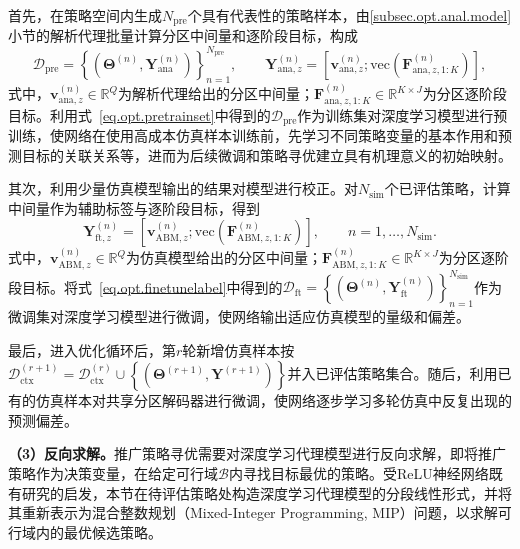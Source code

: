 首先，在策略空间内生成$N_{\mathrm{pre}}$个具有代表性的策略样本，由\ref{subsec.opt.anal.model}小节的解析代理批量计算分区中间量和逐阶段目标，构成
\begin{equation}
\mathcal{D}_{\mathrm{pre}}
=\left\{
\left(
\bm{\Theta}^{(n)},
\bm{Y}_{\mathrm{ana}}^{(n)}
\right)
\right\}_{n=1}^{N_{\mathrm{pre}}},
\qquad
\bm{Y}_{\mathrm{ana},z}^{(n)}
=\left[
\bm{v}_{\mathrm{ana},z}^{(n)};
\mathrm{vec}\left(
\bm{F}_{\mathrm{ana},z,1:K}^{(n)}
\right)
\right],
\label{eq.opt.pretrainset}
\end{equation}
式中，$\bm{v}_{\mathrm{ana},z}^{(n)}\in\mathbb{R}^{Q}$为解析代理给出的分区中间量；$\bm{F}_{\mathrm{ana},z,1:K}^{(n)}\in\mathbb{R}^{K\times J}$为分区逐阶段目标。利用式~\eqref{eq.opt.pretrainset}中得到的$\mathcal{D}_{\mathrm{pre}}$作为训练集对深度学习模型进行预训练，使网络在使用高成本仿真样本训练前，先学习不同策略变量的基本作用和预测目标的关联关系等，进而为后续微调和策略寻优建立具有机理意义的初始映射。

其次，利用少量仿真模型输出的结果对模型进行校正。对$N_{\mathrm{sim}}$个已评估策略，计算中间量作为辅助标签与逐阶段目标，得到
\begin{equation}
\bm{Y}_{\mathrm{ft},z}^{(n)}
=\left[
\bm{v}_{\mathrm{ABM},z}^{(n)};
\mathrm{vec}\left(
\bm{F}_{\mathrm{ABM},z,1:K}^{(n)}
\right)
\right],
\qquad n=1,\ldots,N_{\mathrm{sim}}.
\label{eq.opt.finetunelabel}
\end{equation}
式中，$\bm{v}_{\mathrm{ABM},z}^{(n)}\in\mathbb{R}^{Q}$为仿真模型给出的分区中间量；$\bm{F}_{\mathrm{ABM},z,1:K}^{(n)}\in\mathbb{R}^{K\times J}$为分区逐阶段目标。将式~\eqref{eq.opt.finetunelabel}中得到的$\mathcal{D}_{\mathrm{ft}}=\left\{\left(\bm{\Theta}^{(n)},\bm{Y}_{\mathrm{ft}}^{(n)}\right)\right\}_{n=1}^{N_{\mathrm{sim}}}$作为微调集对深度学习模型进行微调，使网络输出适应仿真模型的量级和偏差。

最后，进入优化循环后，第$r$轮新增仿真样本按$\mathcal{D}_{\mathrm{ctx}}^{(r+1)}=\mathcal{D}_{\mathrm{ctx}}^{(r)}\cup\left\{\left(\bm{\Theta}^{(r+1)},\bm{Y}^{(r+1)}\right)\right\}$并入已评估策略集合。随后，利用已有的仿真样本对共享分区解码器进行微调，使网络逐步学习多轮仿真中反复出现的预测偏差。

\textbf{（3）反向求解。}推广策略寻优需要对深度学习代理模型进行反向求解，即将推广策略作为决策变量，在给定可行域$\mathcal{B}$内寻找目标最优的策略。受ReLU神经网络既有研究的启发\citep{fischettiDeepNeuralNetworks2018,tjengEVALUATINGROBUSTNESSNEURAL2019}，本节在待评估策略处构造深度学习代理模型的分段线性形式，并将其重新表示为混合整数规划（Mixed-Integer Programming, MIP）问题，以求解可行域内的最优候选策略。

